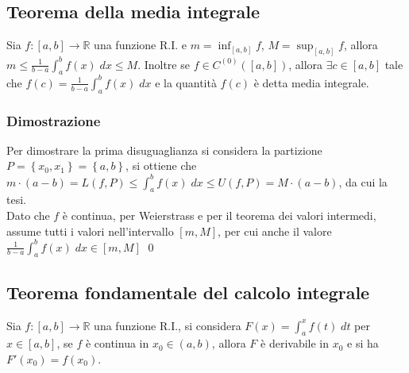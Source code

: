 \documentclass[a4paper]{article}
\newcommand\cont[2]{C^{(#1)} \left({#2}\right)}
\begin{document}
\subsection{Teorema della media integrale}
Sia \(f:\left[a, b\right] \to \mathbb{R}\) una funzione R.I. e \(\displaystyle m = \inf_{\left[a, b\right]} f\), \(\displaystyle M = \sup_{\left[a, b\right]} f\), allora
\(\displaystyle m \leq \frac{1}{b - a} \int_{a}^{b} f(x) \; dx \leq M\). Inoltre se \(f \in \cont{0}{\left[a, b\right]}\), allora \(\exists c \in \left[a, b\right]\) tale che
\(\displaystyle f(c) = \frac{1}{b-a} \int_{a}^{b} f(x) \; dx\) e la quantità \(f(c)\) è detta media integrale.
\subsubsection*{Dimostrazione}
Per dimostrare la prima disuguaglianza si considera la partizione \(P = \left\{x_0, x_1\right\} = \left\{a, b\right\}\), si ottiene che \\
\(\displaystyle m \cdot (a - b) = L(f, P) \leq \int_{a}^{b} f(x) \; dx \leq U(f, P) = M \cdot (a-b)\), da cui la tesi. \\
Dato che \(f\) è continua, per Weierstrass e per il teorema dei valori intermedi, assume tutti i valori nell'intervallo \(\left[m, M\right]\), per cui anche
il valore \(\displaystyle \frac{1}{b-a} \int_{a}^{b} f(x) \; dx \in \left[m, M\right]\) \qed

\subsection{Teorema fondamentale del calcolo integrale}
Sia \(f:\left[a, b\right] \to \mathbb{R}\) una funzione R.I., si considera \(\displaystyle F(x) = \int_{a}^{x} f(t) \; dt\) per \(x \in \left[a, b\right]\),
se \(f\) è continua in \(x_0 \in \left(a, b\right)\), allora \(F\) è derivabile in \(x_0\) e si ha \(F'(x_0) = f(x_0)\).
\end{document}
